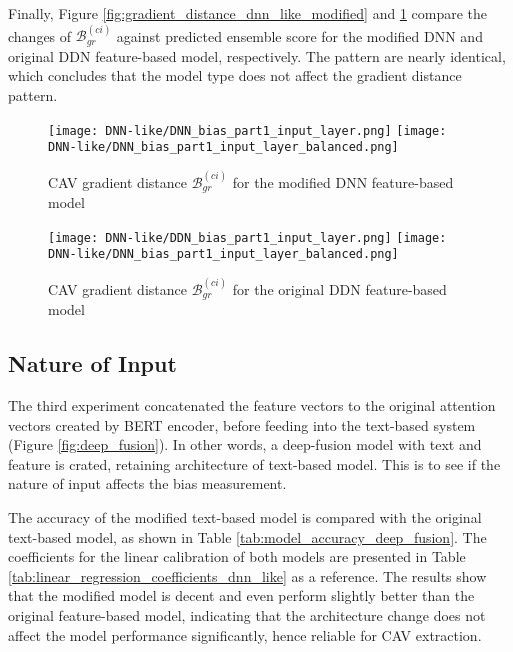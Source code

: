 Finally, Figure \ref{fig:gradient_distance_dnn_like_modified} and \ref{fig:gradient_distance_dnn_like_original} compare the changes of $\mathcal{B}^{(ci)}_{gr}$ against predicted ensemble score for the modified DNN and original DDN feature-based model, respectively. The pattern are nearly identical, which concludes that the model type does not affect the gradient distance pattern.

\begin{figure}[H]
    \centering
    \begin{minipage}[t]{0.48\textwidth}
        \centering
        \texttt{[image: DNN-like/DNN\_bias\_part1\_input\_layer.png]}
        \hfill
        \texttt{[image: DNN-like/DNN\_bias\_part1\_input\_layer\_balanced.png]}
        \caption{CAV gradient distance $\mathcal{B}^{(ci)}_{gr}$ for the modified DNN feature-based model}
        \label{fig:gradient_distance_dnn_like_modified}
    \end{minipage}
    \hfill
    \begin{minipage}[t]{0.48\textwidth}
        \centering
        \texttt{[image: DNN-like/DDN\_bias\_part1\_input\_layer.png]}
        \hfill
        \texttt{[image: DNN-like/DNN\_bias\_part1\_input\_layer\_balanced.png]}
        \caption{CAV gradient distance $\mathcal{B}^{(ci)}_{gr}$ for the original DDN feature-based model}
        \label{fig:gradient_distance_dnn_like_original}
    \end{minipage}
\end{figure}

\subsection{Nature of Input}
The third experiment concatenated the feature vectors to the original attention vectors created by BERT encoder, before feeding into the text-based system (Figure \ref{fig:deep_fusion}). In other words, a deep-fusion model with text and feature is crated, retaining architecture of text-based model. This is to see if the nature of input affects the bias measurement.

The accuracy of the modified text-based model is compared with the original text-based model, as shown in Table \ref{tab:model_accuracy_deep_fusion}. The coefficients for the linear calibration of both models are presented in Table \ref{tab:linear_regression_coefficients_dnn_like} as a reference. The results show that the modified model is decent and even perform slightly better than the original feature-based model, indicating that the architecture change does not affect the model performance significantly, hence reliable for CAV extraction.

